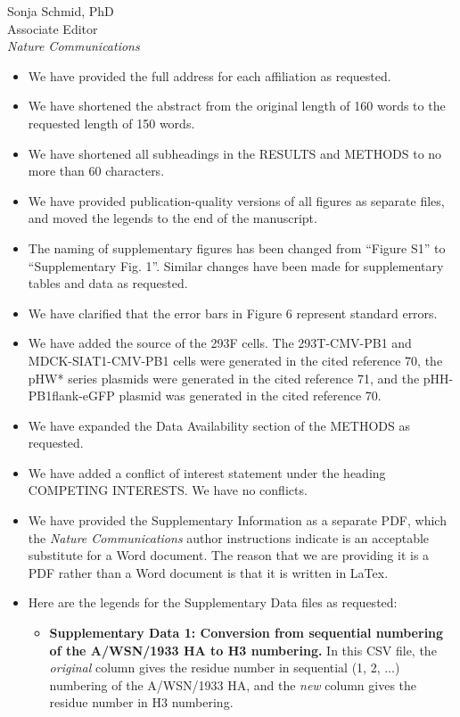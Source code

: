 \documentclass[a4paper,11pt]{letter}
\begin{document}
\begin{letter}{Sonja Schmid, PhD \\ Associate Editor \\ \textit{Nature Communications} }
\begin{itemize}
\item We have provided the full address for each affiliation as requested.

\item We have shortened the abstract from the original length of 160 words to the requested length of 150 words.

\item We have shortened all subheadings in the RESULTS and METHODS to no more than 60 characters.

\item We have provided publication-quality versions of all figures as separate files, and moved the legends to the end of the manuscript.

\item The naming of supplementary figures has been changed from ``Figure S1'' to ``Supplementary Fig. 1''. Similar changes have been made for supplementary tables and data as requested.

\item We have clarified that the error bars in Figure 6 represent standard errors.

\item We have added the source of the 293F cells. The 293T-CMV-PB1 and MDCK-SIAT1-CMV-PB1 cells were generated in the cited reference 70, the pHW* series plasmids were generated in the cited reference 71, and the pHH-PB1flank-eGFP plasmid was generated in the cited reference 70.

\item We have expanded the Data Availability section of the METHODS as requested. 

\item We have added a conflict of interest statement under the heading COMPETING INTERESTS. We have no conflicts.

\item We have provided the Supplementary Information as a separate PDF, which the \textit{Nature Communications} author instructions indicate is an acceptable substitute for a Word document. The reason that we are providing it is a PDF rather than a Word document is that it is written in LaTex. 

\item Here are the legends for the Supplementary Data files as requested:

\begin{itemize}

\item {\bf Supplementary Data 1: Conversion from sequential numbering of the A/WSN/1933 HA to H3 numbering.}
In this CSV file, the \emph{original} column gives the residue number in sequential (1, 2, ...) numbering of the A/WSN/1933 HA, and the \emph{new} column gives the residue number in H3 numbering.


\end{itemize}
\end{itemize}
\end{letter}
\end{document}
